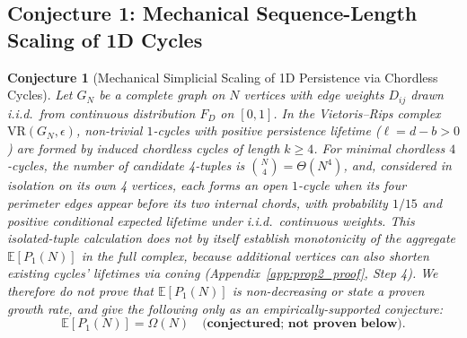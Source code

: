 \documentclass{article}
\newtheorem{conjecture}{Conjecture}
\begin{document}
\subsection{Conjecture 1: Mechanical Sequence-Length Scaling of 1D Cycles}
\begin{conjecture}[Mechanical Simplicial Scaling of 1D Persistence via Chordless Cycles]
\label{prop:scaling}
Let $G_N$ be a complete graph on $N$ vertices with edge weights $D_{ij}$ drawn i.i.d.\ from continuous distribution $F_D$ on $[0, 1]$. In the Vietoris--Rips complex $\text{VR}(G_N, \epsilon)$, non-trivial $1$-cycles with positive persistence lifetime ($\ell = d - b > 0$) are formed by induced chordless cycles of length $k \ge 4$. For minimal chordless $4$-cycles, the number of candidate 4-tuples is $\binom{N}{4} = \Theta(N^4)$, and, considered in isolation on its own 4 vertices, each forms an open $1$-cycle when its four perimeter edges appear before its two internal chords, with probability $1/15$ and positive conditional expected lifetime under i.i.d.\ continuous weights. This isolated-tuple calculation does \emph{not} by itself establish monotonicity of the aggregate $\mathbb{E}[P_1(N)]$ in the full complex, because additional vertices can also \emph{shorten} existing cycles' lifetimes via coning (Appendix~\ref{app:prop2_proof}, Step 4). We therefore do \emph{not} prove that $\mathbb{E}[P_1(N)]$ is non-decreasing or state a proven growth rate, and give the following only as an empirically-supported conjecture:
\begin{equation}
    \mathbb{E}[P_1(N)] = \Omega(N) \quad \textbf{(conjectured; not proven below).}
\end{equation}
\end{conjecture}
\end{document}
